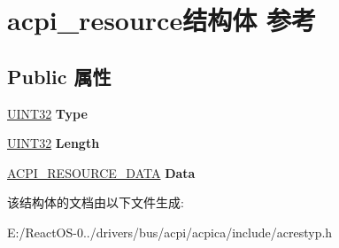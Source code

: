 \hypertarget{structacpi__resource}{}\section{acpi\+\_\+resource结构体 参考}
\label{structacpi__resource}
\subsection*{Public 属性}
\begin{DoxyCompactItemize}
\item 
\mbox{\label{structacpi__resource_ad1c44db03e388371092af7313cda47af}} 
\hyperlink{_processor_bind_8h_ae1e6edbbc26d6fbc71a90190d0266018}{U\+I\+N\+T32} {\bfseries Type}
\item 
\mbox{\label{structacpi__resource_a9614ad732c8713cb5d2e09dc075b3a9d}} 
\hyperlink{_processor_bind_8h_ae1e6edbbc26d6fbc71a90190d0266018}{U\+I\+N\+T32} {\bfseries Length}
\item 
\mbox{\label{structacpi__resource_a47dc68f767e26c1e1263ab31d443ae33}} 
\hyperlink{unionacpi__resource__data}{A\+C\+P\+I\+\_\+\+R\+E\+S\+O\+U\+R\+C\+E\+\_\+\+D\+A\+TA} {\bfseries Data}
\end{DoxyCompactItemize}


该结构体的文档由以下文件生成\+:\begin{DoxyCompactItemize}
\item 
E\+:/\+React\+O\+S-\/0../drivers/bus/acpi/acpica/include/acrestyp.\+h\end{DoxyCompactItemize}
